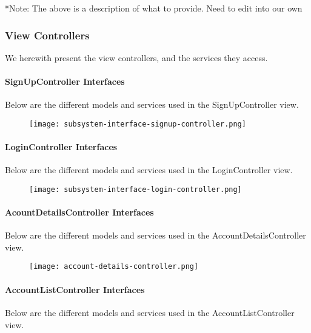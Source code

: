 \documentclass[12pt]{article}
\begin{document}
*Note: The above is a description of what to provide. Need to edit into our own
\subsubsection{View Controllers}

We herewith present the view controllers, and the services they access.
\paragraph{SignUpController Interfaces}

Below are the different models and services used in the SignUpController view.

\begin{figure}[H]
\texttt{[image: subsystem-interface-signup-controller.png]}
\end{figure}

\clearpage

\paragraph{LoginController Interfaces}

Below are the different models and services used in the LoginController view.

\begin{figure}[H]
\texttt{[image: subsystem-interface-login-controller.png]}
\end{figure}

\clearpage

\paragraph{AcountDetailsController Interfaces}

Below are the different models and services used in the AccountDetailsController view.

\begin{figure}[H]
\texttt{[image: account-details-controller.png]}
\end{figure}

\clearpage

\paragraph{AccountListController Interfaces}

Below are the different models and services used in the AccountListController view.
\end{document}
